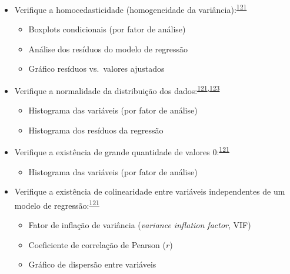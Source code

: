 \documentclass[
  a4paper,
]{book}
\providecommand{\tightlist}{%
  \setlength{\itemsep}{0pt}\setlength{\parskip}{0pt}}
\begin{document}
\begin{itemize}
\item
  Verifique a homocedasticidade (homogeneidade da variância):\textsuperscript{\protect\hyperlink{ref-zuur2009}{121}}

  \begin{itemize}
  \item
    Boxplots condicionais (por fator de análise)
  \item
    Análise dos resíduos do modelo de regressão
  \item
    Gráfico resíduos vs.~valores ajustados
  \end{itemize}
\end{itemize}

\begin{itemize}
\item
  Verifique a normalidade da distribuição dos dados:\textsuperscript{\protect\hyperlink{ref-zuur2009}{121},\protect\hyperlink{ref-chatfield1986}{123}}

  \begin{itemize}
  \item
    Histograma das variáveis (por fator de análise)
  \item
    Histograma dos resíduos da regressão
  \end{itemize}
\end{itemize}

\begin{itemize}
\item
  Verifique a existência de grande quantidade de valores 0:\textsuperscript{\protect\hyperlink{ref-zuur2009}{121}}

  \begin{itemize}
  \tightlist
  \item
    Histograma das variáveis (por fator de análise)
  \end{itemize}
\end{itemize}

\begin{itemize}
\item
  Verifique a existência de colinearidade entre variáveis independentes de um modelo de regressão:\textsuperscript{\protect\hyperlink{ref-zuur2009}{121}}

  \begin{itemize}
  \item
    Fator de inflação de variância (\emph{variance inflation factor}, VIF)
  \item
    Coeficiente de correlação de Pearson (\(r\))
  \item
    Gráfico de dispersão entre variáveis
  \end{itemize}
\end{itemize}
\end{document}
